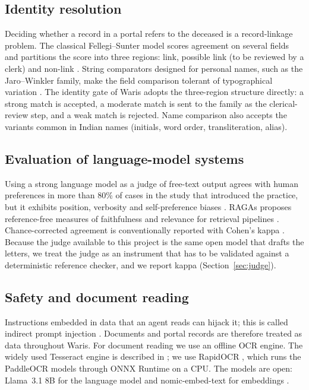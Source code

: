 \subsection{Identity resolution}\label{sec:linkage}
Deciding whether a record in a portal refers to the deceased is a record-linkage problem. The classical Fellegi--Sunter model scores agreement on several fields and partitions the score into three regions: link, possible link (to be reviewed by a clerk) and non-link \cite{fellegi1969}. String comparators designed for personal names, such as the Jaro--Winkler family, make the field comparison tolerant of typographical variation \cite{winkler1990}. The identity gate of Waris adopts the three-region structure directly: a strong match is accepted, a moderate match is sent to the family as the clerical-review step, and a weak match is rejected. Name comparison also accepts the variants common in Indian names (initials, word order, transliteration, alias).

\subsection{Evaluation of language-model systems}
Using a strong language model as a judge of free-text output agrees with human preferences in more than 80\% of cases in the study that introduced the practice, but it exhibits position, verbosity and self-preference biases \cite{zheng2023judge}. RAGAs proposes reference-free measures of faithfulness and relevance for retrieval pipelines \cite{es2024ragas}. Chance-corrected agreement is conventionally reported with Cohen's kappa \cite{cohen1960kappa}. Because the judge available to this project is the same open model that drafts the letters, we treat the judge as an instrument that has to be validated against a deterministic reference checker, and we report kappa (Section~\ref{sec:judge}).

\subsection{Safety and document reading}
Instructions embedded in data that an agent reads can hijack it; this is called indirect prompt injection \cite{greshake2023}. Documents and portal records are therefore treated as data throughout Waris. For document reading we use an offline OCR engine. The widely used Tesseract engine is described in \cite{smith2007tess}; we use RapidOCR \cite{rapidocr}, which runs the PaddleOCR models through ONNX Runtime on a CPU. The models are open: Llama~3.1 8B for the language model \cite{llama3} and nomic-embed-text for embeddings \cite{nomic2024}.

